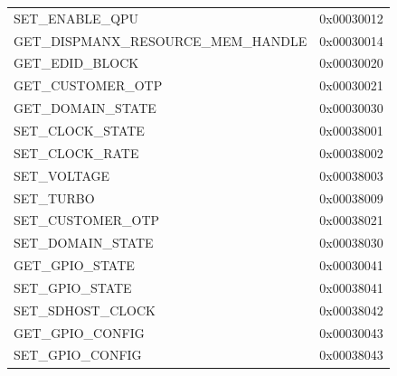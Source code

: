 \documentclass[12pt, svgnames]{book}
\begin{document}
\begin{centering}
{\begin{longtable}{|l | r |}
		 SET\_ENABLE\_QPU &                         0x00030012\\
		 GET\_DISPMANX\_RESOURCE\_MEM\_HANDLE &       0x00030014\\
		 GET\_EDID\_BLOCK &                         0x00030020\\
		 GET\_CUSTOMER\_OTP &                       0x00030021\\
		 GET\_DOMAIN\_STATE &                       0x00030030\\
		 SET\_CLOCK\_STATE &                        0x00038001\\
		 SET\_CLOCK\_RATE &                         0x00038002\\
		 SET\_VOLTAGE &                            0x00038003\\
		 SET\_TURBO &                              0x00038009\\
		 SET\_CUSTOMER\_OTP &                       0x00038021\\
		 SET\_DOMAIN\_STATE &                       0x00038030\\
		 GET\_GPIO\_STATE &                         0x00030041\\
		 SET\_GPIO\_STATE &                         0x00038041\\
		 SET\_SDHOST\_CLOCK &                       0x00038042\\
		 GET\_GPIO\_CONFIG &                        0x00030043\\
		 SET\_GPIO\_CONFIG &                        0x00038043\\


\end{longtable}}
\end{centering}
\end{document}
